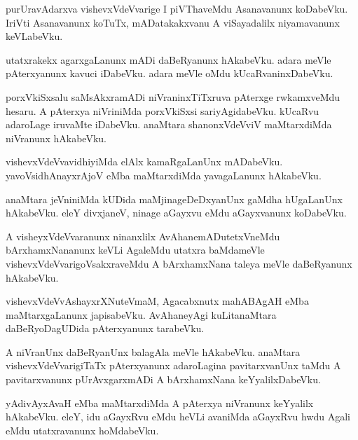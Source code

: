 \documentclass{article}
\begin{document}
\begin{mn}
purUravAdarxva  vishevxVdeVvarige  I  piVThaveMdu  Asanavanunx  koDabeVku.  IriVti  Asanavanunx  koTuTx,  mADatakakxvanu  
A  viSayadalilx  niyamavanunx  keVLabeVku.
\end{mn}

\begin{mn}
utatxrakekx  agarxgaLanunx  mADi  daBeRyanunx  hAkabeVku.  adara  meVle  pAterxyanunx  kavuci  iDabeVku.  adara  meVle  
oMdu  kUcaRvaninxDabeVku.
\end{mn}

\begin{mn}
porxVkiSxsalu  saMsAkxramADi  niVraninxTiTxruva  pAterxge  rwkamxveMdu  hesaru.  A  pAterxya  niVriniMda  porxVkiSxsi  
sariyAgidabeVku.  kUcaRvu  adaroLage  iruvaMte  iDabeVku.  anaMtara  shanonxVdeVviV  maMtarxdiMda  niVranunx  hAkabeVku.
\end{mn}

\begin{mn}
vishevxVdeVvavidhiyiMda  elAlx  kamaRgaLanUnx  mADabeVku.  yavoVsidhAnayxrAjoV  eMba  maMtarxdiMda  yavagaLanunx  hAkabeVku.
\end{mn}

\begin{mn}
anaMtara  jeVniniMda  kUDida  maMjinageDeDxyanUnx  gaMdha  hUgaLanUnx  hAkabeVku.  eleY  divxjaneV,  ninage  aGayxvu  
eMdu  aGayxvanunx  koDabeVku.
\end{mn}

\begin{mn}
A  visheyxVdeVvaranunx  ninanxlilx  AvAhanemADutetxVneMdu  bArxhamxNananunx  keVLi  AgaleMdu  utatxra  baMdameVle  
vishevxVdeVvarigoVsakxraveMdu  
A  bArxhamxNana  taleya  meVle  daBeRyanunx  hAkabeVku.
\end{mn}

\begin{mn}
vishevxVdeVvAshayxrXNuteVmaM,  Agacabxnutx  mahABAgAH  eMba  maMtarxgaLanunx  japisabeVku.  AvAhaneyAgi  kuLitanaMtara  
daBeRyoDagUDida  pAterxyanunx  tarabeVku.
\end{mn}

\begin{mn}
A  niVranUnx  daBeRyanUnx  balagAla  meVle  hAkabeVku.  anaMtara  vishevxVdeVvarigiTaTx  pAterxyanunx  adaroLagina  
pavitarxvanUnx  taMdu  A  pavitarxvanunx  pUrAvxgarxmADi  A  bArxhamxNana  keYyalilxDabeVku.
\end{mn}

\begin{mn}
yAdivAyxAvaH  eMba  maMtarxdiMda  A  pAterxya  niVranunx  keYyalilx  hAkabeVku.  eleY,  idu  aGayxRvu  eMdu  heVLi  
avaniMda  aGayxRvu  hwdu  Agali  eMdu  utatxravanunx  hoMdabeVku.
\end{mn}
\end{document}
